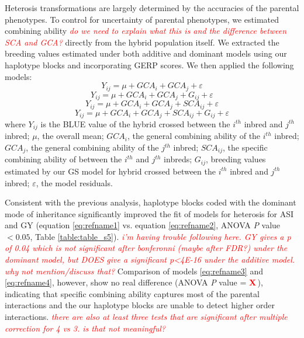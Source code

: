 \documentclass[twoside,twocolumn, letterpaper]{article}
\newcommand{\X}{\textcolor{red}{\bf X\,}}
\newcommand{\jri}[1]{\textcolor{red}{ \emph{ #1}} }
\begin{document}
Heterosis transformations are largely determined by the accuracies of the parental phenotypes. 
To control for uncertainty of parental phenotypes, we estimated combining ability \jri{do we need to explain what this is and the difference between SCA and GCA?} directly from the hybrid population itself.
We extracted the breeding values estimated under both additive and dominant models using our haplotype blocks and incorporating GERP scores. 
We then applied the following models:
\begin{equation}
Y_{ij} = \mu + GCA_{i} + GCA_{j} + \varepsilon
\label{eq:refname1}
\end{equation}
\begin{equation}
Y_{ij} = \mu + GCA_{i} + GCA_{j} +  G_{ij} + \varepsilon
\label{eq:refname2}
\end{equation}
\begin{equation}
Y_{ij} = \mu + GCA_{i} + GCA_{j} + SCA_{ij} + \varepsilon
\label{eq:refname3}
\end{equation}
\begin{equation}
Y_{ij} = \mu + GCA_{i} + GCA_{j} + SCA_{ij} + G_{ij} + \varepsilon
\label{eq:refname4}
\end{equation}
where 
$Y_{ij}$ is the BLUE value of the hybrid crossed between the $i^{th}$ inbred and $j^{th}$ inbred; 
$\mu$, the overall mean; 
$GCA_{i}$, the general combining ability of the $i^{th}$ inbred;
$GCA_{j}$, the general combining ability of the $j^{th}$ inbred;
$SCA_{ij}$, the specific combining ability of between the $i^{th}$ and $j^{th}$ inbreds;
$G_{ij}$, breeding values estimated by our GS model for hybrid crossed between the $i^{th}$ inbred and $j^{th}$ inbred; 
$\varepsilon$, the model residuals.

Consistent with the previous analysis, haplotype blocks coded with the dominant mode of inheritance significantly improved the fit of models for heterosis for ASI and GY (equation \ref{eq:refname1} vs. equation \ref{eq:refname2}, ANOVA \emph{P} value $<0.05$, Table \ref{table:table_s5}). \jri{i'm having trouble following here.  GY gives a p of 0.04 which is not significant after bonferonni (maybe after FDR?) under the dominant model, but DOES give a significant p<4E-16 under the additive model. why not mention/discuss that? }
Comparison of models \ref{eq:refname3} and \ref{eq:refname4}, however, show no real difference (ANOVA \emph{P} value = \X), indicating that specific combining ability captures most of the parental interactions and the our haplotype blocks are unable to detect higher order interactions. \jri{ there are also at least three tests that are significant after multiple correction for 4 vs 3. is that not meaningful?} 
\end{document}

